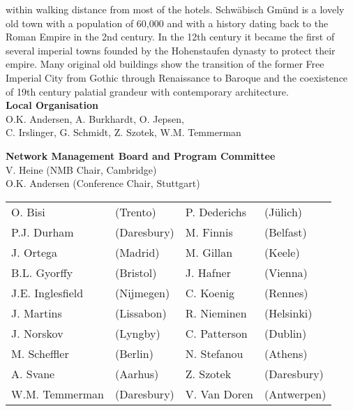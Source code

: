 {within walking distance from most of the hotels. Schw\"abisch Gm\"und is a lovely
old town with a population of 60,000 and with a history dating back to the
Roman Empire in the 2nd century. In the 12th century it became the first of
several imperial towns founded by the Hohenstaufen dynasty to protect their
empire. Many original old buildings show the transition of the former Free
Imperial City from Gothic through Renaissance to Baroque and the coexistence
of 19th century palatial grandeur with contemporary architecture.\\[3mm]
{\large\bf Local Organisation}\\[5mm]
O.K. Andersen, A. Burkhardt, O. Jepsen,\\ C. Irslinger, G. Schmidt,
Z. Szotek, W.M. Temmerman\\[3mm]
\par
{\large\bf Network Management Board and Program Committee}\\[5mm]
V. Heine	(NMB Chair, Cambridge)\\
O.K. Andersen	(Conference Chair, Stuttgart)\\[3mm]
\begin{tabular}{l l l l }
O. Bisi		& (Trento) &	P. Dederichs &	(J\"ulich)\\
P.J. Durham	& (Daresbury) &	M. Finnis &	(Belfast)\\
J. Ortega	& (Madrid) &	M. Gillan &	(Keele)\\
B.L. Gyorffy	& (Bristol) &	J. Hafner &	(Vienna)\\
J.E. Inglesfield& (Nijmegen) &	C. Koenig &	(Rennes)\\
J. Martins	& (Lissabon) &	R. Nieminen &	(Helsinki)\\
J. Norskov	& (Lyngby) &	C. Patterson &	(Dublin)\\
M. Scheffler	& (Berlin) &	N. Stefanou &	(Athens)\\
A. Svane	& (Aarhus) &	Z. Szotek &	(Daresbury)\\
W.M. Temmerman	& (Daresbury) &	V. Van Doren &	(Antwerpen)\\[3mm]
\end{tabular}

}

